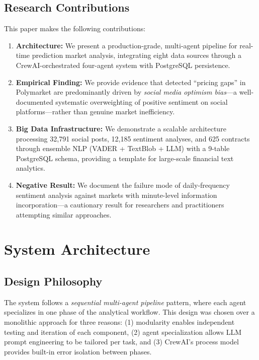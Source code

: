 \documentclass[12pt, letterpaper]{article}
\begin{document}
\subsection{Research Contributions}

This paper makes the following contributions:

\begin{enumerate}
    \item \textbf{Architecture:} We present a production-grade, multi-agent pipeline for real-time prediction market analysis, integrating eight data sources through a CrewAI-orchestrated four-agent system with PostgreSQL persistence.

    \item \textbf{Empirical Finding:} We provide evidence that detected ``pricing gaps'' in Polymarket are predominantly driven by \textit{social media optimism bias}---a well-documented systematic overweighting of positive sentiment on social platforms---rather than genuine market inefficiency.

    \item \textbf{Big Data Infrastructure:} We demonstrate a scalable architecture processing 32,791 social posts, 12,185 sentiment analyses, and 625 contracts through ensemble NLP (VADER + TextBlob + LLM) with a 9-table PostgreSQL schema, providing a template for large-scale financial text analytics.

    \item \textbf{Negative Result:} We document the failure mode of daily-frequency sentiment analysis against markets with minute-level information incorporation---a cautionary result for researchers and practitioners attempting similar approaches.
\end{enumerate}

\section{System Architecture}

\subsection{Design Philosophy}

The system follows a \textit{sequential multi-agent pipeline} pattern, where each agent specializes in one phase of the analytical workflow. This design was chosen over a monolithic approach for three reasons: (1) modularity enables independent testing and iteration of each component, (2) agent specialization allows LLM prompt engineering to be tailored per task, and (3) CrewAI's process model provides built-in error isolation between phases.
\end{document}
